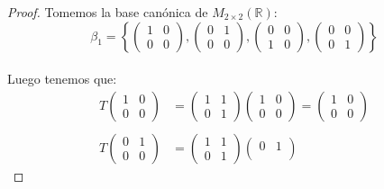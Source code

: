 \documentclass[11pt]{article}
\newcommand{\R}{\mathbb{R}}
\begin{document}
\begin{proof}
    Tomemos la base can\'onica de $M_{2\times 2}(\R)$:\,\\
    \begin{equation*}
        \beta_1=\left\{\begin{pmatrix}
            1&0\\
            0&0
        \end{pmatrix},\begin{pmatrix}
            0&1\\
            0&0
        \end{pmatrix},\begin{pmatrix}
            0&0\\
            1&0
        \end{pmatrix},\begin{pmatrix}
            0&0\\
            0&1
        \end{pmatrix}\right\}
    \end{equation*}\,\\
    Luego tenemos que:\,\\
    \begin{align*}
        T\begin{pmatrix}
            1&0\\
            0&0
        \end{pmatrix}&=\begin{pmatrix}
            1&1\\
            0&1
        \end{pmatrix}\begin{pmatrix}
            1&0\\
            0&0
        \end{pmatrix}=\begin{pmatrix}
            1&0\\
            0&0
        \end{pmatrix}\\
        \,\\
        T\begin{pmatrix}
            0&1\\
            0&0
        \end{pmatrix}&=\begin{pmatrix}
            1&1\\
            0&1
        \end{pmatrix}\begin{pmatrix}
            0&1\\

\end{pmatrix}
\end{align*}
\end{proof}
\end{document}
